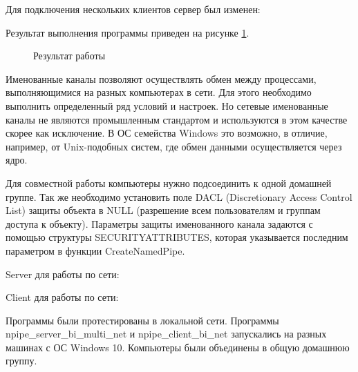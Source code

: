 \documentclass[a4paper]{article}
\begin{document}
	Для подключения нескольких клиентов сервер был изменен:
	
	
	Результат выполнения программы приведен на рисунке \ref{img:task4_2}.
	\begin{figure}[h!]
		\caption{Результат работы}
		\label{img:task4_2}
	\end{figure}
	
	Именованные каналы позволяют осуществлять обмен между процессами, выполняющимися на разных компьютерах в сети. Для этого необходимо выполнить определенный ряд условий и настроек. Но сетевые именованные каналы не являются промышленным стандартом и используются в этом качестве скорее как исключение. В ОС семейства Windows это возможно, в отличие, например, от Unix-подобных систем, где обмен данными осуществляется через ядро.
	
	Для совместной работы компьютеры нужно подсоединить к одной домашней группе. Так же необходимо установить поле DACL (Discretionary Access Control List) защиты объекта в NULL (разрешение всем пользователям и группам доступа к объекту). Параметры защиты именованного канала задаются с помощью структуры SECURITYATTRIBUTES, которая указывается последним параметром в функции CreateNamedPipe.
	
	Server для работы по сети:
	
	
	Client для работы по сети:
	
	
	Программы были протестированы в локальной сети. Программы npipe\_server\_bi\_multi\_net и npipe\_client\_bi\_net запускались на разных машинах с ОС Windows 10. Компьютеры были объединены в общую домашнюю группу.
	
\end{document}

